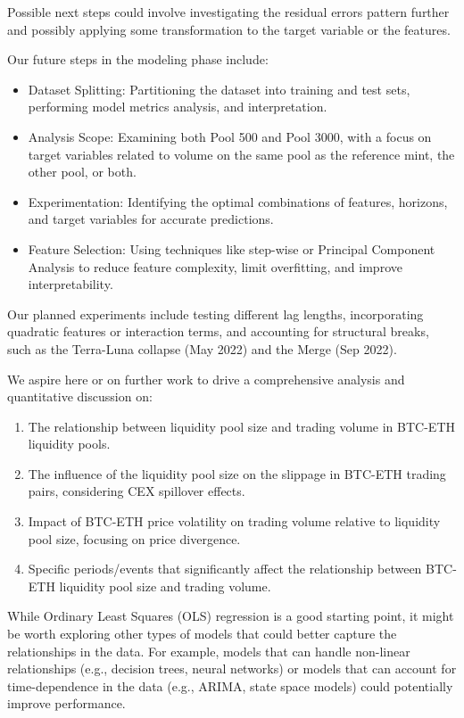 \documentclass{article}
\begin{document}
Possible next steps could involve investigating the residual errors pattern further and possibly applying some transformation to the target variable or the features.

Our future steps in the modeling phase include:

\begin{itemize}
\item Dataset Splitting: Partitioning the dataset into training and test sets, performing model metrics analysis, and interpretation.
\item Analysis Scope: Examining both Pool 500 and Pool 3000, with a focus on target variables related to volume on the same pool as the reference mint, the other pool, or both.
\item Experimentation: Identifying the optimal combinations of features, horizons, and target variables for accurate predictions.
\item Feature Selection: Using techniques like step-wise or Principal Component Analysis to reduce feature complexity, limit overfitting, and improve interpretability.
\end{itemize}

Our planned experiments include testing different lag lengths, incorporating quadratic features or interaction terms, and accounting for structural breaks, such as the Terra-Luna collapse (May 2022) and the Merge (Sep 2022).

We aspire here or on further work to drive a comprehensive analysis and quantitative discussion on:

\begin{enumerate}[itemsep=0pt, topsep=0pt]
\item The relationship between liquidity pool size and trading volume in BTC-ETH liquidity pools.
\item The influence of the liquidity pool size on the slippage in BTC-ETH trading pairs, considering CEX spillover effects.
\item Impact of BTC-ETH price volatility on trading volume relative to liquidity pool size, focusing on price divergence.
\item Specific periods/events that significantly affect the relationship between BTC-ETH liquidity pool size and trading volume.
\end{enumerate}


While Ordinary Least Squares (OLS) regression is a good starting point, it might be worth exploring other types of models that could better capture the relationships in the data. For example, models that can handle non-linear relationships (e.g., decision trees, neural networks) or models that can account for time-dependence in the data (e.g., ARIMA, state space models) could potentially improve performance.
\end{document}
